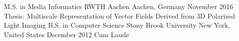 \begin{cventries}
  \cventry
    {M.S. in Media Informatics}
    {RWTH Aachen}
    {Aachen, Germany}
    {November 2016}
    {Thesis: Multiscale Representation of Vector Fields Derived from 3D Polarized Light Imaging}
  \cventry
    {B.S. in Computer Science}
    {Stony Brook University}
    {New York, United States}
    {December 2012}
    {Cum Laude}
\end{cventries}
